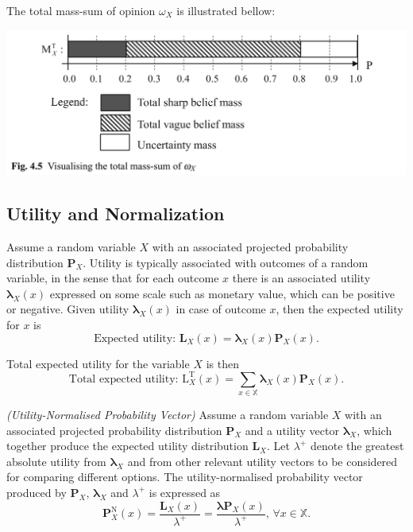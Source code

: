 The total mass-sum of opinion $\omega_X$ is illustrated bellow:

\includegraphics[width=\linewidth]{images/fig.4.5.png}

\subsection{Utility and Normalization}

Assume a random variable $X$ with an associated projected probability distribution
$\mathbf{P}_X$. Utility is typically associated with outcomes of a random variable, in the sense that for each outcome $x$ there is an associated utility $\bm{\lambda}_X(x)$ expressed on some scale
such as monetary value, which can be positive or negative. Given utility $\bm{\lambda}_X(x)$ in
case of outcome $x$, then the expected utility for $x$ is
\begin{equation}
    \text{Expected utility: } \mathbf{L}_X(x) = \bm{\lambda}_X(x) \mathbf{P}_X(x) \text{.}
\end{equation}

Total expected utility for the variable $X$ is then
\begin{equation}
    \text{Total expected utility: } \mathrm{L}^{\mathrm{T}}_X(x) = \sum\limits_{x \in \mathbb{X}} \bm{\lambda}_X(x) \mathbf{P}_X(x) \text{.}
\end{equation}

\begin{definition}
    \emph{(Utility-Normalised Probability Vector)} Assume a random variable $X$ with an associated projected probability distribution $\mathbf{P}_X$ and a utility vector
$\bm{\lambda}_X$, which together produce the expected utility distribution $\mathbf{L}_X$. Let $\lambda^+$ denote the
greatest absolute utility from $\bm{\lambda}_X$ and from other relevant utility vectors to be considered for comparing different options. The utility-normalised probability vector produced by $\mathbf{P}_X$, $\bm{\lambda}_X$ and $\lambda^+$ is expressed as
    \begin{equation}
        \mathbf{P}^{\mathrm{N}}_X(x) = \dfrac{\mathbf{L}_X(x)}{\lambda^+} = \dfrac{\bm{\lambda} \mathbf{P}_X(x)}{\lambda^+} \text{, } \forall x \in \mathbb{X} \text{.}
    \end{equation}
\end{definition}

